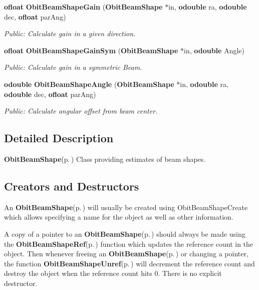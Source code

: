 \begin{CompactItemize}
{\bf ofloat} {\bf Obit\-Beam\-Shape\-Gain} ({\bf Obit\-Beam\-Shape} $\ast$in, {\bf odouble} ra, {\bf odouble} dec, {\bf ofloat} par\-Ang)
\begin{CompactList}\small\item\em Public: Calculate gain in a given direction. \item\end{CompactList}\item 
{\bf ofloat} {\bf Obit\-Beam\-Shape\-Gain\-Sym} ({\bf Obit\-Beam\-Shape} $\ast$in, {\bf odouble} Angle)
\begin{CompactList}\small\item\em Public: Calculate gain in a symmetric Beam. \item\end{CompactList}\item 
{\bf odouble} {\bf Obit\-Beam\-Shape\-Angle} ({\bf Obit\-Beam\-Shape} $\ast$in, {\bf odouble} ra, {\bf odouble} dec, {\bf ofloat} par\-Ang)
\begin{CompactList}\small\item\em Public: Calculate angular offset from beam center. \item\end{CompactList}\end{CompactItemize}


\subsection{Detailed Description}
{\bf Obit\-Beam\-Shape}{\rm (p.\,\pageref{structObitBeamShape})} Class providing estimates of beam shapes. 

\subsection{Creators and Destructors}\label{ObitBeamShape_8h_ObitBeamShapeaccess}
An {\bf Obit\-Beam\-Shape}{\rm (p.\,\pageref{structObitBeamShape})} will usually be created using Obit\-Beam\-Shape\-Create which allows specifying a name for the object as well as other information.

A copy of a pointer to an {\bf Obit\-Beam\-Shape}{\rm (p.\,\pageref{structObitBeamShape})} should always be made using the {\bf Obit\-Beam\-Shape\-Ref}{\rm (p.\,\pageref{ObitBeamShape_8h_a1})} function which updates the reference count in the object. Then whenever freeing an {\bf Obit\-Beam\-Shape}{\rm (p.\,\pageref{structObitBeamShape})} or changing a pointer, the function {\bf Obit\-Beam\-Shape\-Unref}{\rm (p.\,\pageref{ObitBeamShape_8h_a0})} will decrement the reference count and destroy the object when the reference count hits 0. There is no explicit destructor.

